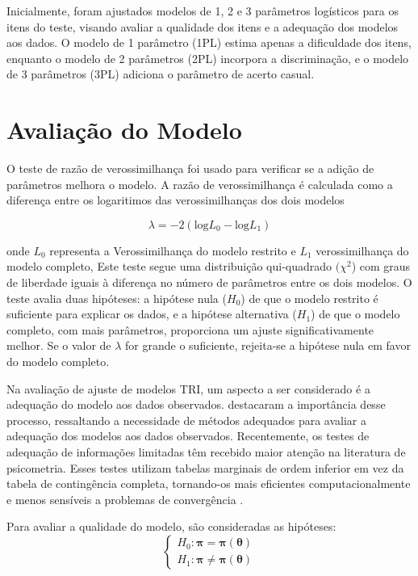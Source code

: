 Inicialmente, foram ajustados modelos de 1, 2 e 3 parâmetros logísticos para os itens do teste, visando avaliar a qualidade dos itens e a adequação dos modelos aos dados. O modelo de 1 parâmetro (1PL) estima apenas a dificuldade dos itens, enquanto o modelo de 2 parâmetros (2PL) incorpora a discriminação, e o modelo de 3 parâmetros (3PL) adiciona o parâmetro de acerto casual.

\section{Avaliação do Modelo}

O teste de razão de verossimilhança foi usado para verificar se a adição de parâmetros melhora o modelo. A razão de verossimilhança é calculada como a diferença entre os logaritimos das verossimilhanças dos dois modelos

\[
	\lambda = -2 (\text{log} L_0 - \text{log} L_1)
\]

onde $L_0$ representa a Verossimilhança do modelo restrito e
$L_1$ verossimilhança do modelo completo, Este teste segue uma distribuição qui-quadrado $(\chi^2$) com graus de liberdade iguais à diferença no número de parâmetros entre os dois modelos. O teste avalia duas hipóteses: a hipótese nula ($H_0$) de que o modelo restrito é suficiente para explicar os dados, e a hipótese alternativa ($H_1$) de que o modelo completo, com mais parâmetros, proporciona um ajuste significativamente melhor. Se o valor de $\lambda$ for grande o suficiente, rejeita-se a hipótese nula em favor do modelo completo.

Na avaliação de ajuste de modelos TRI, um aspecto a ser considerado é a adequação do modelo aos dados observados.  destacaram a importância desse processo, ressaltando a necessidade de métodos adequados para avaliar a adequação dos modelos aos dados observados. Recentemente, os testes de adequação de informações limitadas têm recebido maior atenção na literatura de psicometria. Esses testes utilizam tabelas marginais de ordem inferior em vez da tabela de contingência completa, tornando-os mais eficientes computacionalmente e menos sensíveis a problemas de convergência \cite{maydeu2014assessing}.

Para avaliar a qualidade do modelo, são consideradas as hipóteses:
\[
\begin{cases}
H_0: \boldsymbol{\pi} = \boldsymbol{\pi}(\boldsymbol{\theta}) \\

H_1: \boldsymbol{\pi} \neq \boldsymbol{\pi}(\boldsymbol{\theta})
\end{cases}
\]

